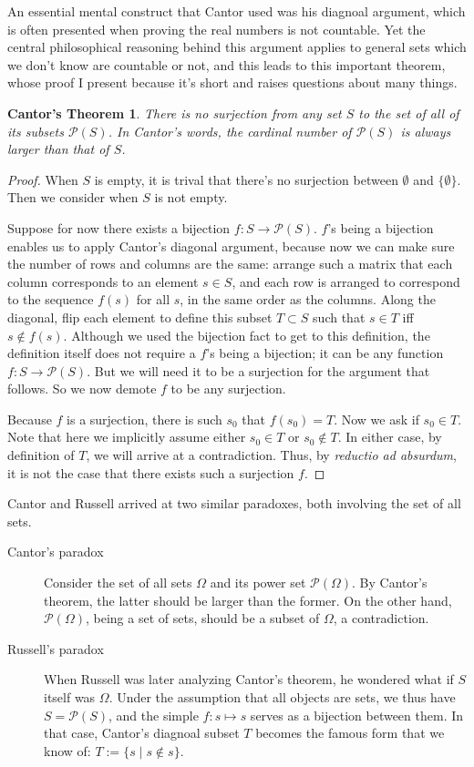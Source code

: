 \documentclass{article}
\newtheorem*{CT}{Cantor's Theorem}
\begin{document}
An essential mental construct that Cantor used was his diagnoal argument, which
is often presented when proving the real numbers is not countable. Yet the
central philosophical reasoning behind this argument applies to general sets
which we don't know are countable or not, and this leads to this important
theorem, whose proof I present because it's short and raises questions about
many things.
\begin{CT}
There is no surjection from any set $S$ to the set of all of its subsets
$\mathcal{P}(S)$. In Cantor's words, the cardinal number of $\mathcal{P}(S)$ is
always larger than that of $S$.
\end{CT}
\begin{proof}
When $S$ is empty, it is trival that there's no surjection between $\emptyset$
and $\{\emptyset\}$. Then we consider when $S$ is not empty.

Suppose for now there exists a bijection $f : S \to
\mathcal{P}(S)$. $f$'s being a bijection enables us to apply Cantor's
diagonal argument, because now we can make sure the number of rows and columns
are the same: arrange such a matrix that each column corresponds to an element
$s \in S$, and each row is arranged to correspond to the sequence $f(s)$ for
all $s$, in the same order as the columns. Along the diagonal, flip each
element to define this subset $T \subset S$ such that $s \in T$ iff $s \notin
f(s)$. Although we used the bijection fact to get to this definition, the
definition itself does not require a $f$'s being a bijection; it can be any
function $f : S \to \mathcal{P}(S)$. But we will need it to be a surjection for
the argument that follows. So we now demote $f$ to be any surjection.

Because $f$ is a surjection, there is such $s_0$ that $f(s_0) = T$. Now we ask
if $s_0 \in T$. Note that here we implicitly assume either $s_0 \in T$ or $s_0
\notin T$. In either case, by definition of $T$, we will arrive at a
contradiction. Thus, by \emph{reductio ad absurdum}, it is not the case
that there exists such a surjection $f$.
\end{proof}

Cantor and Russell arrived at two similar paradoxes, both involving the set of
all sets.
\begin{description}
	\item[Cantor's paradox] Consider the set of all sets $\Omega$ and its
		power set $\mathcal{P}(\Omega)$. By Cantor's theorem, the latter should
		be larger than the former. On the other hand, $\mathcal{P}(\Omega)$,
		being a set of sets, should be a subset of $\Omega$, a contradiction.
	\item [Russell's paradox] When Russell was later analyzing Cantor's
		theorem, he wondered what if $S$ itself was $\Omega$. Under the
		assumption that all objects are sets, we thus have $S =
		\mathcal{P}(S)$, and the simple $f: s \mapsto s$ serves as a bijection
		between them. In that case, Cantor's diagnoal subset $T$ becomes the
		famous form that we know of: $T := \{s \mid s \notin s \}$.
\end{description}
\end{document}
